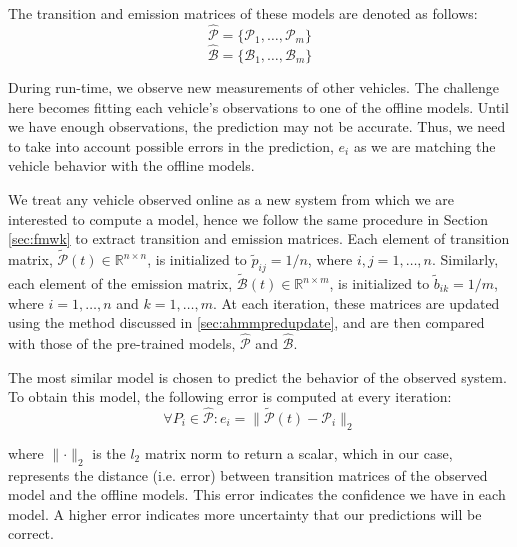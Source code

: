 \documentclass[letterpaper, 10 pt, conference]{ieeeconf}  %
\newcommand\NB[1]{$\spadesuit$\footnote{NB: #1}}
\begin{document}
The transition and emission matrices of these models are denoted as follows:
\begin{equation}
    \hat{\mathcal{P}} = \{\mathcal{P}_1,\ldots,\mathcal{P}_m\}
\end{equation}
\begin{equation}
    \hat{\mathcal{B}} = \{\mathcal{B}_1,\ldots,\mathcal{B}_{m}\}
\end{equation}


During run-time, we observe new measurements of other vehicles. The challenge here becomes fitting each vehicle's observations to one of the offline models. Until we have enough observations, the prediction may not be accurate. Thus, we need to take into account possible errors in the prediction, $e_i$ as we are matching the vehicle behavior with the offline models. 

We treat any vehicle observed online as a new system from which we are interested to compute a model, hence we follow the same procedure in Section \ref{sec:fmwk} to extract transition and emission matrices. Each element of transition matrix, $\tilde{\mathcal{P}}(t)\in\mathbb{R}^{n\times n}$, is initialized to $\tilde{p}_{ij} = 1/n$, where $i,j = 1,\ldots,n$. Similarly, each element of the emission matrix,  $\tilde{\mathcal{B}}(t)\in\mathbb{R}^{n\times m}$, is initialized to $\tilde{b}_{ik}= 1/m$, where $i = 1,\ldots,n$ and $k=1,\ldots,m$. At each iteration, these matrices are updated using the method discussed in \ref{sec:ahmmpredupdate}, and are then compared with those of the pre-trained models, $\hat{\mathcal{P}}$ and $\hat{\mathcal{B}}$.

The most similar model is chosen to predict the behavior of the observed system. To obtain this model, the following error is computed at every iteration:
\begin{equation} \label{eq:pnorm}
    \forall{P_i} \in \hat{\mathcal{P}}: e_i = \lVert\tilde{\mathcal{P}}(t)-\mathcal{P}_{i}\rVert_{2}
\end{equation}

where $\lVert \cdot \rVert_2$ is the $l_2$ matrix norm to return a scalar, which in our case, represents the distance (i.e. error) between transition matrices of the observed model and the offline models. This error indicates the confidence we have in each model. A higher error indicates more uncertainty that our predictions will be correct.
\end{document}
